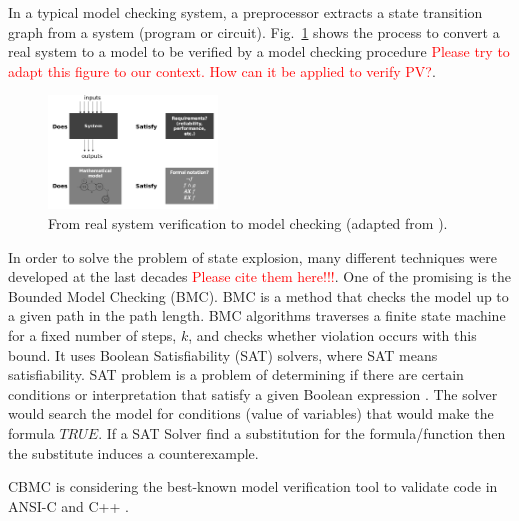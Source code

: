 \documentclass[journal]{IEEEtran}
\begin{document}
In a typical model checking system, a preprocessor extracts a state transition graph from a system (program or circuit).
%
%
%
Fig.~\ref{fig:systemverif} shows the process to convert a real system to a model to be verified by a model checking procedure \textcolor{red}{Please try to adapt this figure to our context. How can it be applied to verify PV?}. 

\begin{figure}[h]
\includegraphics[width=0.4\textwidth]{systemverif}
\centering
\caption{From real system verification to model checking (adapted from \cite{Clarke2008}).}
\label{fig:systemverif}
\end{figure}

In order to solve the problem of state explosion, many different techniques were developed at the last decades \textcolor{red}{Please cite them here!!!}. One of the promising is the Bounded Model Checking (BMC). BMC is a method that checks the model up to a given path in the path length. BMC algorithms traverses a finite state machine for a fixed number of steps, $ k $, and checks whether violation occurs with this bound. It uses Boolean Satisfiability (SAT) solvers, where SAT means satisfiability. SAT problem is a problem of determining if there are certain conditions or interpretation that satisfy a given Boolean expression \cite{Clarke2008}. %
The solver would search the model for conditions (value of variables) that would make the formula $TRUE$. If a SAT Solver find a substitution for the formula/function then the substitute induces a counterexample.  

CBMC is considering the best-known model verification tool to validate code in ANSI-C and C++ \cite{Kroening}. 
\end{document}
